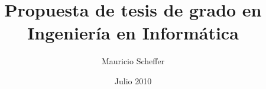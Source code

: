 \documentclass[11pt,a4paper,oneside]{report}
\begin{document}
\title{Propuesta de tesis de grado en Ingeniería en Informática}
\author{Mauricio Scheffer}
\date{Julio 2010}
\maketitle
\end{document}
